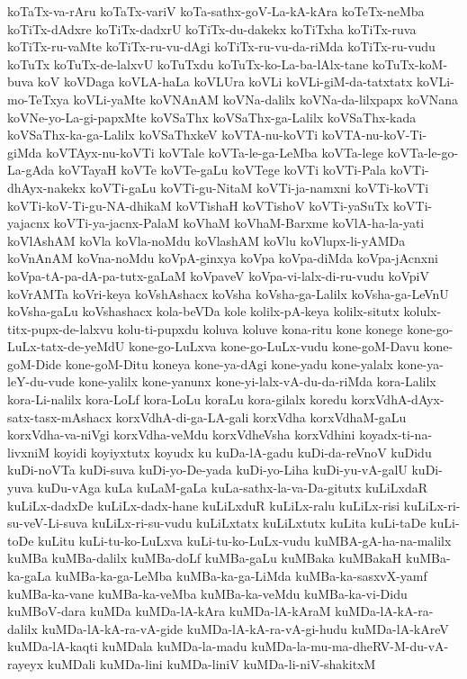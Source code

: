 {koTaTx-va-rAru
koTaTx-variV
koTa-sathx-goV-La-kA-kAra
koTeTx-neMba
koTiTx-dAdxre
koTiTx-dadxrU
koTiTx-du-dakekx
koTiTxha
koTiTx-ruva
koTiTx-ru-vaMte
koTiTx-ru-vu-dAgi
koTiTx-ru-vu-da-riMda
koTiTx-ru-vudu
koTuTx
koTuTx-de-lalxvU
koTuTxdu
koTuTx-ko-La-ba-lAlx-tane
koTuTx-koM-buva
koV
koVDaga
koVLA-haLa
koVLUra
koVLi
koVLi-giM-da-tatxtatx
koVLi-mo-TeTxya
koVLi-yaMte
koVNAnAM
koVNa-dalilx
koVNa-da-lilxpapx
koVNana
koVNe-yo-La-gi-papxMte
koVSaThx
koVSaThx-ga-Lalilx
koVSaThx-kada
koVSaThx-ka-ga-Lalilx
koVSaThxkeV
koVTA-nu-koVTi
koVTA-nu-koV-Ti-giMda
koVTAyx-nu-koVTi
koVTale
koVTa-le-ga-LeMba
koVTa-lege
koVTa-le-go-La-gAda
koVTayaH
koVTe
koVTe-gaLu
koVTege
koVTi
koVTi-Pala
koVTi-dhAyx-nakekx
koVTi-gaLu
koVTi-gu-NitaM
koVTi-ja-namxni
koVTi-koVTi
koVTi-koV-Ti-gu-NA-dhikaM
koVTishaH
koVTishoV
koVTi-yaSuTx
koVTi-yajacnx
koVTi-ya-jacnx-PalaM
koVhaM
koVhaM-Barxme
koVlA-ha-la-yati
koVlAshAM
koVla
koVla-noMdu
koVlashAM
koVlu
koVlupx-li-yAMDa
koVnAnAM
koVna-noMdu
koVpA-ginxya
koVpa
koVpa-diMda
koVpa-jAcnxni
koVpa-tA-pa-dA-pa-tutx-gaLaM
koVpaveV
koVpa-vi-lalx-di-ru-vudu
koVpiV
koVrAMTa
koVri-keya
koVshAshacx
koVsha
koVsha-ga-Lalilx
koVsha-ga-LeVnU
koVsha-gaLu
koVshashacx
kola-beVDa
kole
kolilx-pA-keya
kolilx-situtx
kolulx-titx-pupx-de-lalxvu
kolu-ti-pupxdu
koluva
koluve
kona-ritu
kone
konege
kone-go-LuLx-tatx-de-yeMdU
kone-go-LuLxva
kone-go-LuLx-vudu
kone-goM-Davu
kone-goM-Dide
kone-goM-Ditu
koneya
kone-ya-dAgi
kone-yadu
kone-yalalx
kone-ya-leY-du-vude
kone-yalilx
kone-yanunx
kone-yi-lalx-vA-du-da-riMda
kora-Lalilx
kora-Li-nalilx
kora-LoLf
kora-LoLu
koraLu
kora-gilalx
koredu
korxVdhA-dAyx-satx-tasx-mAshacx
korxVdhA-di-ga-LA-gali
korxVdha
korxVdhaM-gaLu
korxVdha-va-niVgi
korxVdha-veMdu
korxVdheVsha
korxVdhini
koyadx-ti-na-livxniM
koyidi
koyiyxtutx
koyudx
ku
kuDa-lA-gadu
kuDi-da-reVnoV
kuDidu
kuDi-noVTa
kuDi-suva
kuDi-yo-De-yada
kuDi-yo-Liha
kuDi-yu-vA-galU
kuDi-yuva
kuDu-vAga
kuLa
kuLaM-gaLa
kuLa-sathx-la-va-Da-gitutx
kuLiLxdaR
kuLiLx-dadxDe
kuLiLx-dadx-hane
kuLiLxduR
kuLiLx-ralu
kuLiLx-risi
kuLiLx-ri-su-veV-Li-suva
kuLiLx-ri-su-vudu
kuLiLxtatx
kuLiLxtutx
kuLita
kuLi-taDe
kuLi-toDe
kuLitu
kuLi-tu-ko-LuLxva
kuLi-tu-ko-LuLx-vudu
kuMBA-gA-ha-na-malilx
kuMBa
kuMBa-dalilx
kuMBa-doLf
kuMBa-gaLu
kuMBaka
kuMBakaH
kuMBa-ka-gaLa
kuMBa-ka-ga-LeMba
kuMBa-ka-ga-LiMda
kuMBa-ka-sasxvX-yamf
kuMBa-ka-vane
kuMBa-ka-veMba
kuMBa-ka-veMdu
kuMBa-ka-vi-Didu
kuMBoV-dara
kuMDa
kuMDa-lA-kAra
kuMDa-lA-kAraM
kuMDa-lA-kA-ra-dalilx
kuMDa-lA-kA-ra-vA-gide
kuMDa-lA-kA-ra-vA-gi-hudu
kuMDa-lA-kAreV
kuMDa-lA-kaqti
kuMDala
kuMDa-la-madu
kuMDa-la-mu-ma-dheRV-M-du-vA-rayeyx
kuMDali
kuMDa-lini
kuMDa-liniV
kuMDa-li-niV-shakitxM
}
